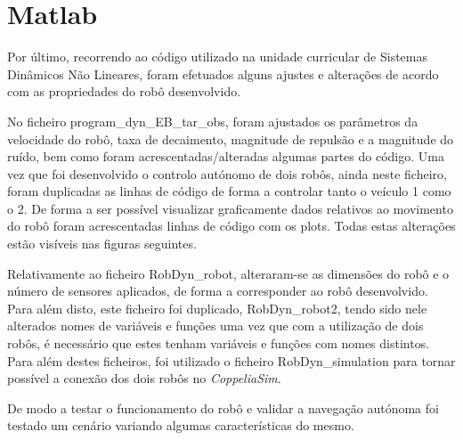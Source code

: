 \section{Matlab}
\label{sec:matlab}

Por último, recorrendo ao código utilizado na unidade curricular de Sistemas Dinâmicos Não Lineares, foram efetuados alguns ajustes e alterações de acordo com as propriedades do robô desenvolvido.

No ficheiro program\_dyn\_EB\_tar\_obs, foram ajustados os parâmetros da velocidade do robô, taxa de decaimento, magnitude de repulsão e a magnitude do ruído, bem como foram acrescentadas/alteradas algumas partes do código. Uma vez que foi desenvolvido o controlo autónomo de dois robôs, ainda neste ficheiro, foram duplicadas as linhas de código de forma a controlar tanto o veículo 1 como o 2. De forma a ser possível visualizar graficamente dados relativos ao movimento do robô foram acrescentadas linhas de código com os plots. Todas estas alterações estão visíveis nas figuras seguintes.

Relativamente ao ficheiro RobDyn\_robot, alteraram-se as dimensões do robô e o número de sensores aplicados, de forma a corresponder ao robô desenvolvido. Para além disto, este ficheiro foi duplicado, RobDyn\_robot2, tendo sido nele alterados nomes de variáveis e funções uma vez que com a utilização de dois robôs, é necessário que estes tenham variáveis e funções com nomes distintos. Para além destes ficheiros, foi utilizado o ficheiro RobDyn\_simulation para tornar possível a conexão dos dois robôs no \textit{CoppeliaSim}.

De modo a testar o funcionamento do robô e validar a navegação autónoma foi testado um cenário variando algumas características do mesmo.
\clearpage


%

%

%
